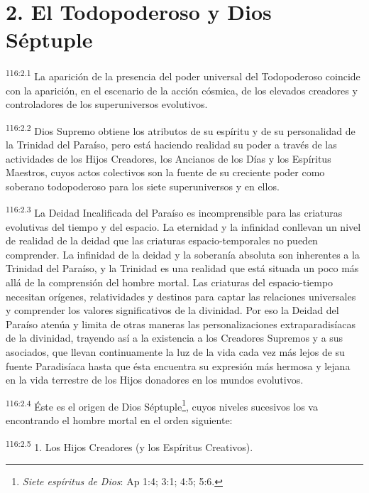 \documentclass[twoside, 11pt]{book}
\begin{document}
\section*{2. El Todopoderoso y Dios Séptuple}
\par
\textsuperscript{116:2.1} La aparición de la presencia del poder universal del Todopoderoso coincide con la aparición, en el escenario de la acción cósmica, de los elevados creadores y controladores de los superuniversos evolutivos.

\par
\textsuperscript{116:2.2} Dios Supremo obtiene los atributos de su espíritu y de su personalidad de la Trinidad del Paraíso, pero está haciendo realidad su poder a través de las actividades de los Hijos Creadores, los Ancianos de los Días y los Espíritus Maestros, cuyos actos colectivos son la fuente de su creciente poder como soberano todopoderoso para los siete superuniversos y en ellos.

\par
\textsuperscript{116:2.3} La Deidad Incalificada del Paraíso es incomprensible para las criaturas evolutivas del tiempo y del espacio. La eternidad y la infinidad conllevan un nivel de realidad de la deidad que las criaturas espacio-temporales no pueden comprender. La infinidad de la deidad y la soberanía absoluta son inherentes a la Trinidad del Paraíso, y la Trinidad es una realidad que está situada un poco más allá de la comprensión del hombre mortal. Las criaturas del espacio-tiempo necesitan orígenes, relatividades y destinos para captar las relaciones universales y comprender los valores significativos de la divinidad. Por eso la Deidad del Paraíso atenúa y limita de otras maneras las personalizaciones extraparadisíacas de la divinidad, trayendo así a la existencia a los Creadores Supremos y a sus asociados, que llevan continuamente la luz de la vida cada vez más lejos de su fuente Paradisíaca hasta que ésta encuentra su expresión más hermosa y lejana en la vida terrestre de los Hijos donadores en los mundos evolutivos.

\par
\textsuperscript{116:2.4} Éste es el origen de Dios Séptuple\footnote{\textit{Siete espíritus de Dios}: Ap 1:4; 3:1; 4:5; 5:6.}, cuyos niveles sucesivos los va encontrando el hombre mortal en el orden siguiente:

\par
\textsuperscript{116:2.5} 1. Los Hijos Creadores (y los Espíritus Creativos).
\end{document}
